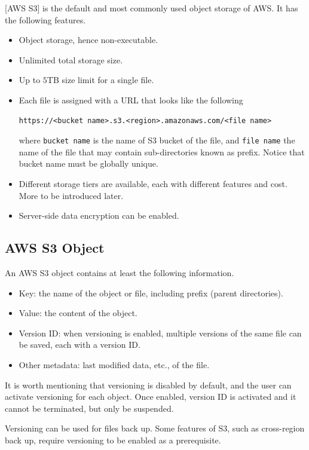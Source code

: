 [AWS S3] is the default and most commonly used object storage of AWS. It has the following features.

\begin{itemize}
	\item Object storage, hence non-executable.
	\item Unlimited total storage size.
	\item Up to $5$TB size limit for a single file.
	\item Each file is assigned with a URL that looks like the following
	\begin{lstlisting}
https://<bucket name>.s3.<region>.amazonaws.com/<file name>
	\end{lstlisting}
	where \verb|bucket name| is the name of S3 bucket of the file, and \verb|file name| the name of the file that may contain sub-directories known as prefix. Notice that bucket name must be globally unique.
	\item Different storage tiers are available, each with different features and cost. More to be introduced later.
	\item Server-side data encryption can be enabled.
\end{itemize}

\subsection{AWS S3 Object}

An AWS S3 object contains at least the following information.
\begin{itemize}
	\item Key: the name of the object or file, including prefix (parent directories).
	\item Value: the content of the object.
	\item Version ID: when versioning is enabled, multiple versions of the same file can be saved, each with a version ID.
	\item Other metadata: last modified data, etc., of the file.
\end{itemize}

It is worth mentioning that versioning is disabled by default, and the user can activate versioning for each object. Once enabled, version ID is activated and it cannot be terminated, but only be suspended.

Versioning can be used for files back up. Some features of S3, such as cross-region back up, require versioning to be enabled as a prerequisite.

